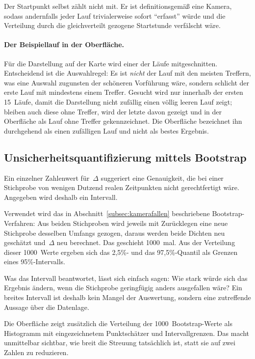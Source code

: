 \documentclass[12pt,a4paper]{report}
\begin{document}
Der Startpunkt selbst zählt nicht mit. Er ist definitionsgemäß eine Kamera, sodass andernfalls
jeder Lauf trivialerweise sofort \enquote{erfasst} würde und die Verteilung durch die
gleichverteilt gezogene Startstunde verfälscht wäre.

\paragraph{Der Beispiellauf in der Oberfläche.} Für die Darstellung auf der Karte wird einer
der Läufe mitgeschnitten. Entscheidend ist die Auswahlregel: Es ist \emph{nicht} der Lauf mit
den meisten Treffern, was eine Auswahl zugunsten der schöneren Vorführung wäre, sondern
schlicht der erste Lauf mit mindestens einem Treffer. Gesucht wird nur innerhalb der ersten
15~Läufe, damit die Darstellung nicht zufällig einen völlig leeren Lauf zeigt; bleiben auch
diese ohne Treffer, wird der letzte davon gezeigt und in der Oberfläche als Lauf ohne Treffer
gekennzeichnet. Die Oberfläche bezeichnet ihn durchgehend als einen zufälligen Lauf und nicht
als bestes Ergebnis.

\subsection{Unsicherheitsquantifizierung mittels Bootstrap}
\label{subsec:bootstrap-umsetzung}

Ein einzelner Zahlenwert für~$\Delta$ suggeriert eine Genauigkeit, die bei einer Stichprobe
von wenigen Dutzend realen Zeitpunkten nicht gerechtfertigt wäre. Angegeben wird deshalb ein
Intervall.

Verwendet wird das in Abschnitt~\ref{subsec:kamerafallen} beschriebene Bootstrap-Verfahren:
Aus beiden Stichproben wird jeweils mit Zurücklegen eine neue Stichprobe desselben Umfangs
gezogen, daraus werden beide Dichten neu geschätzt und~$\Delta$ neu berechnet. Das geschieht
1000~mal. Aus der Verteilung dieser 1000~Werte ergeben sich das 2{,}5\%- und das
97{,}5\%-Quantil als Grenzen eines 95\%-Intervalls.

Was das Intervall beantwortet, lässt sich einfach sagen: Wie stark würde sich das Ergebnis
ändern, wenn die Stichprobe geringfügig anders ausgefallen wäre? Ein breites Intervall ist
deshalb kein Mangel der Auswertung, sondern eine zutreffende Aussage über die Datenlage.

Die Oberfläche zeigt zusätzlich die Verteilung der 1000~Bootstrap-Werte als Histogramm mit
eingezeichnetem Punktschätzer und Intervallgrenzen. Das macht unmittelbar sichtbar, wie breit
die Streuung tatsächlich ist, statt sie auf zwei Zahlen zu reduzieren.
\end{document}
